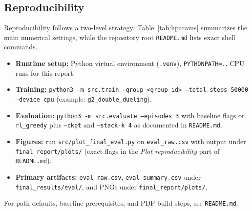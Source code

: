 \documentclass[letterpaper]{article}
\begin{document}
\subsection{Reproducibility}
Reproducibility follows a two-level strategy: Table~\ref{tab:hparams} summarizes the main numerical settings, while the repository root \texttt{README.md} lists exact shell commands.
\begin{itemize}[leftmargin=1.2em]
    \item \textbf{Runtime setup:} Python virtual environment (\texttt{.venv}), \texttt{PYTHONPATH=.}, CPU runs for this report.
    \item \textbf{Training:} \texttt{python3 -m src.train --group <group\_id> --total-steps 50000 --device cpu} (example: \texttt{g2\_double\_dueling}).
    \item \textbf{Evaluation:} \texttt{python3 -m src.evaluate --episodes 3} with baseline flags or \texttt{rl\_greedy} plus \texttt{--ckpt} and \texttt{--stack-k 4} as documented in \texttt{README.md}.
    \item \textbf{Figures:} run \texttt{src/plot\_final\_eval.py} on \texttt{eval\_raw.csv} with output under \texttt{final\_report/plots/} (exact flags in the \emph{Plot reproducibility} part of \texttt{README.md}).
    \item \textbf{Primary artifacts:} \texttt{eval\_raw.csv}, \texttt{eval\_summary.csv} under \texttt{final\_results/eval/}, and PNGs under \texttt{final\_report/plots/}.
\end{itemize}

For path defaults, baseline prerequisites, and PDF build steps, see \texttt{README.md}.
\end{document}

